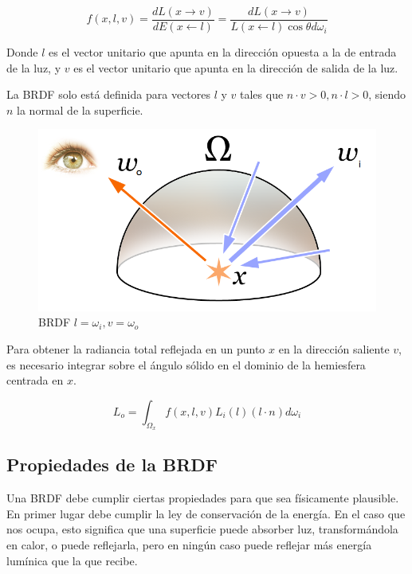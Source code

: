 \begin{equation}
f(x, l, v)=\frac{dL(x \to v)}{dE(x \gets l)} = \frac{dL(x \to v)}{L(x \gets l) \cos\theta d\omega_i} 
\end{equation}

Donde $l$ es el vector unitario que apunta en la dirección opuesta a la de entrada de la luz, y $v$ es el vector unitario que apunta en la dirección de salida de la luz.

La BRDF solo está definida para vectores $l$ y $v$ tales que $n \cdot v > 0, n \cdot l > 0$, siendo $n$ la normal de la superficie.

\begin{figure}[h]
\centering
\includegraphics[scale=0.5]{Rendering_eq.png}
\caption{BRDF $l = \omega_i, v = \omega_o$ \cite{Timrb2008}}
\end{figure}


Para obtener la radiancia total reflejada en un punto $x$ en la dirección saliente $v$, es necesario integrar sobre el ángulo sólido en el dominio de la hemiesfera centrada en $x$.

\begin{equation}
\label{eq:radiance_integral}
L _ o = \int_{\Omega_x} f(x, l, v) L_i(l) (l \cdot n) d\omega_i 
\end{equation}

\clearpage

\subsection{Propiedades de la BRDF}

Una BRDF debe cumplir ciertas propiedades para que sea físicamente plausible.
En primer lugar debe cumplir la ley de conservación de la energía. En el caso que nos ocupa, esto significa que una superficie puede absorber luz, transformándola en calor, o puede reflejarla, pero en ningún caso puede reflejar más energía lumínica que la que recibe.


